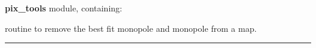 \begin{modules}
  \begin{sulist}{} %
  \item[\textbf{pix\_tools}] module, containing:
  \end{sulist}
\end{modules}

\begin{related}
  \begin{sulist}{} %
  \item[\htmlref{remove\_dipole}{sub:remove_dipole}] routine to remove the best fit monopole and
  monopole from a map.
  \end{sulist}
\end{related}

\rule{\hsize}{2mm}

\newpage
